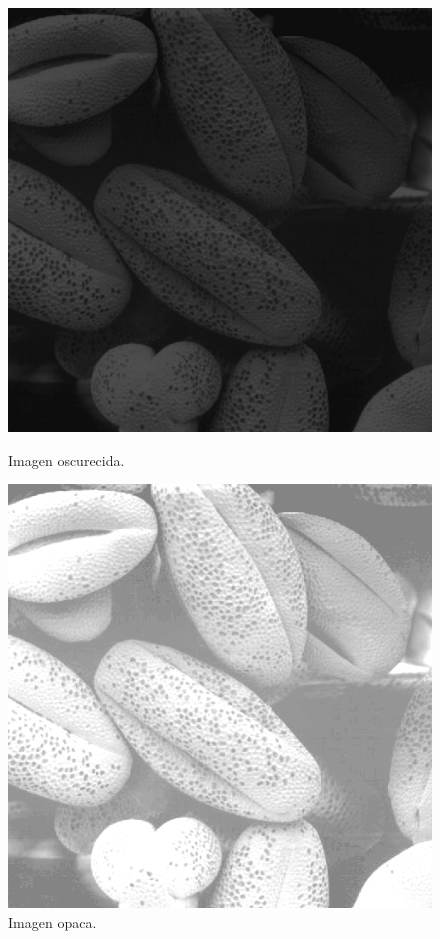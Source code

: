 \documentclass[11pt, letterpaper]{article}
\begin{document}
\begin{figure}[h!]
	\centering
	\begin{minipage}{0.45\textwidth}
		\centering
		\includegraphics[width=\textwidth]{IMG/Fig3.15(a)1.jpg}
		\caption{Imagen oscurecida.}
		\label{fig:f1}
	\end{minipage}\hfill
	\begin{minipage}{0.45\textwidth}
		\centering
		\includegraphics[width=\textwidth]{IMG/Fig3.15(a)2.jpg}
		\caption{Imagen opaca.}
		\label{fig:f2}
	\end{minipage}
	

\end{figure}
\end{document}

